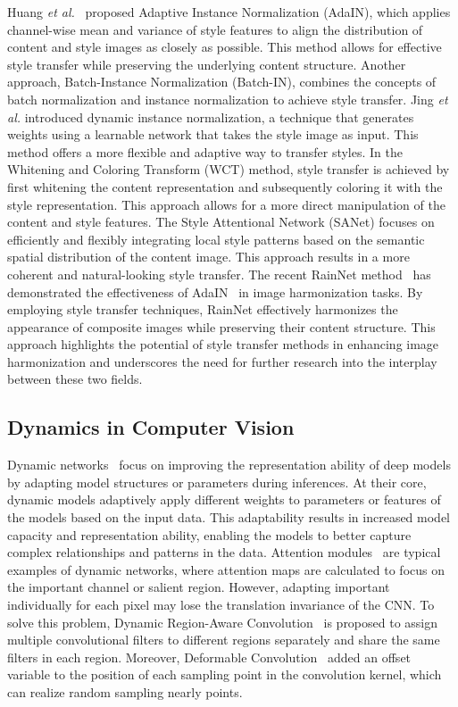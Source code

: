 \documentclass[sigconf]{acmart}
\begin{document}
Huang \textit{et al.}~\cite{AdaIN} proposed Adaptive Instance Normalization (AdaIN), which applies channel-wise mean and variance of style features to align the distribution of content and style images as closely as possible. This method allows for effective style transfer while preserving the underlying content structure. Another approach, Batch-Instance Normalization (Batch-IN)\cite{BatchInsN}, combines the concepts of batch normalization and instance normalization to achieve style transfer. Jing \textit{et al.}\cite{DyIN} introduced dynamic instance normalization, a technique that generates weights using a learnable network that takes the style image as input. This method offers a more flexible and adaptive way to transfer styles. In the Whitening and Coloring Transform (WCT)\cite{wct} method, style transfer is achieved by first whitening the content representation and subsequently coloring it with the style representation. This approach allows for a more direct manipulation of the content and style features. The Style Attentional Network (SANet)\cite{SANet} focuses on efficiently and flexibly integrating local style patterns based on the semantic spatial distribution of the content image. This approach results in a more coherent and natural-looking style transfer. The recent RainNet method~\cite{RAIN} has demonstrated the effectiveness of AdaIN~\cite{AdaIN} in image harmonization tasks. By employing style transfer techniques, RainNet effectively harmonizes the appearance of composite images while preserving their content structure. This approach highlights the potential of style transfer methods in enhancing image harmonization and underscores the need for further research into the interplay between these two fields.

\subsection{Dynamics in Computer Vision}

Dynamic networks~\cite{han2021dynamic,woo2018cbam,drconv,deconv,yaohuimm} focus on improving the representation ability of deep models by adapting model structures or parameters during inferences. At their core, dynamic models adaptively apply different weights to parameters or features of the models based on the input data. This adaptability results in increased model capacity and representation ability, enabling the models to better capture complex relationships and patterns in the data. Attention modules~\cite{woo2018cbam} are typical examples of dynamic networks, where attention maps are calculated to focus on the important channel or salient region. However, adapting important individually for each pixel may lose the translation invariance of the CNN. To solve this problem, Dynamic Region-Aware Convolution~\cite{drconv} is
proposed to assign multiple convolutional filters to different regions separately and share the same filters in each region. Moreover, Deformable Convolution~\cite{deconv,adap_deconv,deconv2} added an offset variable to the position of each sampling point in the convolution kernel, which can realize random sampling nearly points.
\end{document}
